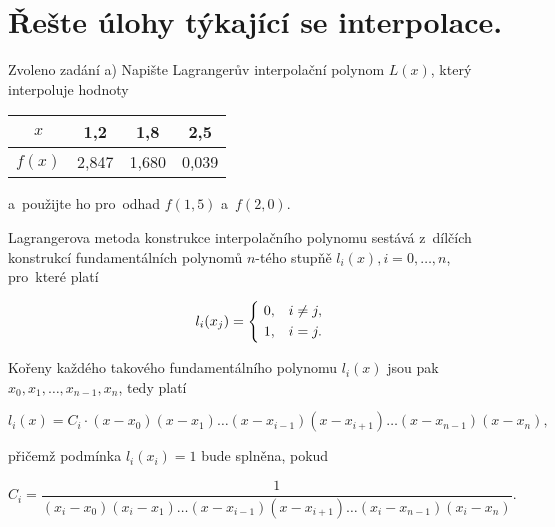 \documentclass[a4paper,10pt]{article}
\author{Bc. Jan Hladěna}
\begin{document}
\pagestyle{fancy}



\section{Řešte úlohy týkající se interpolace.}
\label{sec:lagrange}
\par Zvoleno zadání a) Napište Lagrangerův interpolační polynom $L(x)$, který interpoluje
hodnoty

\begin{center}
	\begin{tabular}{|c|c|c|c|}
		\hline
		$x$ & 1,2 & 1,8 & 2,5 \\
		\hline
		$f(x)$ & 2,847 & 1,680 & 0,039 \\
		\hline
	\end{tabular}
\end{center}

a~použijte ho pro~odhad $f(1,5)$ a~$f(2,0)$. 


\par Lagrangerova metoda konstrukce interpolačního polynomu sestává z~dílčích konstrukcí
fundamentálních polynomů $n$-tého stupňě $l_i(x), i=0,\dots,n$, pro~které platí

\[l_i(x_j)= 
\begin{dcases}
    {~}0, & i\neq{j},\\
    {~}1, & i=j.\\
\end{dcases}
\]

\par Kořeny každého takového fundamentálního polynomu $l_i(x)$ jsou pak
$x_0, x_1, \dots, x_{n-1}, x_n$, tedy platí

\begin{equation}
l_i(x)=C_i\cdot(x-x_0)(x-x_1)\dots(x-x_{i-1})(x-x_{i+1})\dots(x-x_{n-1})(x-x_n),
\end{equation}

přičemž podmínka $l_i(x_i)=1$ bude splněna, pokud

\begin{equation}
C_i=\dfrac{1}{(x_i-x_0)(x_i-x_1)\dots(x-x_{i-1})(x-x_{i+1})\dots(x_i-x_{n-1})(x_i-x_n)}.
\end{equation}
\end{document}
